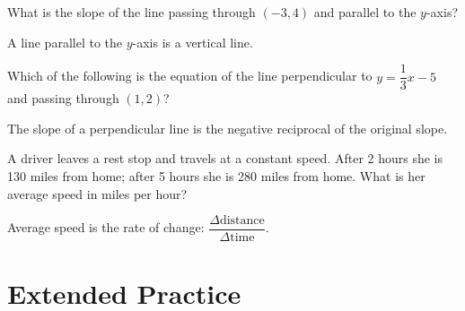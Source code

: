 \documentclass{ximera}
\begin{document}
\begin{problem}
What is the slope of the line passing through $(-3,4)$ and parallel to the $y$-axis?
\begin{hint}
A line parallel to the $y$-axis is a vertical line.
\end{hint}
\begin{multipleChoice}
  \choice{$\infty$}
\end{multipleChoice}
\end{problem}

\begin{problem}
Which of the following is the equation of the line perpendicular to $y = \dfrac{1}{3}x - 5$ and passing through $(1,2)$?
\begin{hint}
The slope of a perpendicular line is the negative reciprocal of the original slope.
\end{hint}
\begin{multipleChoice}
\end{multipleChoice}
\end{problem}

\begin{problem}
A driver leaves a rest stop and travels at a constant speed. After 2 hours she is 130 miles from home; after 5 hours she is 280 miles from home. What is her average speed in miles per hour?
\begin{hint}
Average speed is the rate of change: $\dfrac{\Delta \text{distance}}{\Delta \text{time}}$.
\end{hint}
\begin{multipleChoice}
\end{multipleChoice}
\end{problem}


\bigskip
\section*{Extended Practice}
\end{document}
